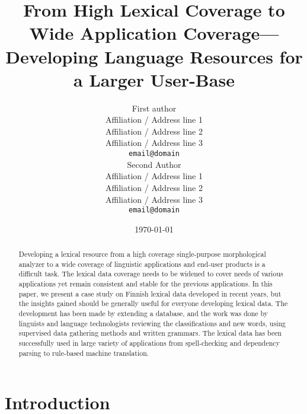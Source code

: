 \documentclass[11pt]{article}
\title{From High Lexical Coverage to Wide Application Coverage---Developing
Language Resources for a Larger User-Base}
\author{First author \\
  Affiliation / Address line 1 \\
  Affiliation / Address line 2 \\
  Affiliation / Address line 3 \\
  {\tt email@domain} \\\And
  Second Author \\
  Affiliation / Address line 1 \\
  Affiliation / Address line 2 \\
  Affiliation / Address line 3 \\
  {\tt email@domain} \\}
\date{\today}
\begin{document}
\maketitle

\begin{abstract}
    Developing a lexical resource from a high coverage single-purpose morphological
    analyzer to a wide coverage of linguistic applications and end-user products
    is a difficult task. The lexical data coverage needs to be widened to cover
    needs of various applications yet remain consistent and stable for the
    previous applications. In this paper, we present a case study on Finnish
    lexical data developed in recent years, but the insights gained should be
    generally useful for everyone developing lexical data. The development has
    been made by extending a database, and the work was done by linguists and
    language technologists reviewing the classifications and new words, using
    supervised data gathering methods and written grammars.  The lexical
    data has been successfully used in large variety of applications from
    spell-checking and dependency parsing to rule-based machine translation. 
\end{abstract}


\section{Introduction}
\label{sec:intro}

% 
\end{document}
